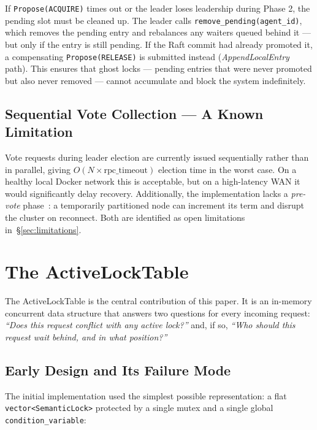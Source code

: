\documentclass[sigconf]{acmart}
\begin{document}
If \texttt{Propose(ACQUIRE)} times out or the leader loses leadership during Phase 2,
the pending slot must be cleaned up. The leader calls \texttt{remove\_\-pending(agent\_id)},
which removes the pending entry and rebalances any waiters queued behind it — but only
if the entry is still pending. If the Raft commit had already promoted it, a compensating
\texttt{Propose(RELEASE)} is submitted instead (\emph{AppendLocalEntry} path). This
ensures that ghost locks — pending entries that were never promoted but also never
removed — cannot accumulate and block the system indefinitely.

\subsection{Sequential Vote Collection — A Known Limitation}
\label{sec:raft-limit}

Vote requests during leader election are currently issued sequentially rather than in
parallel, giving $O(N \times \text{rpc\_timeout})$ election time in the worst case.
On a healthy local Docker network this is acceptable, but on a high-latency WAN it would
significantly delay recovery. Additionally, the implementation lacks a \emph{pre-vote}
phase~\cite{raft}: a temporarily partitioned node can increment its term and disrupt the
cluster on reconnect. Both are identified as open limitations in~\S\ref{sec:limitations}.

\section{The ActiveLockTable}
\label{sec:lock-table}

The ActiveLockTable is the central contribution of this paper. It is an in-memory
concurrent data structure that answers two questions for every incoming request:
\emph{``Does this request conflict with any active lock?''} and, if so,
\emph{``Who should this request wait behind, and in what position?''}

\subsection{Early Design and Its Failure Mode}

The initial implementation used the simplest possible representation: a flat
\texttt{vector<SemanticLock>} protected by a single mutex and a single global
\texttt{condition\_variable}:
\end{document}
